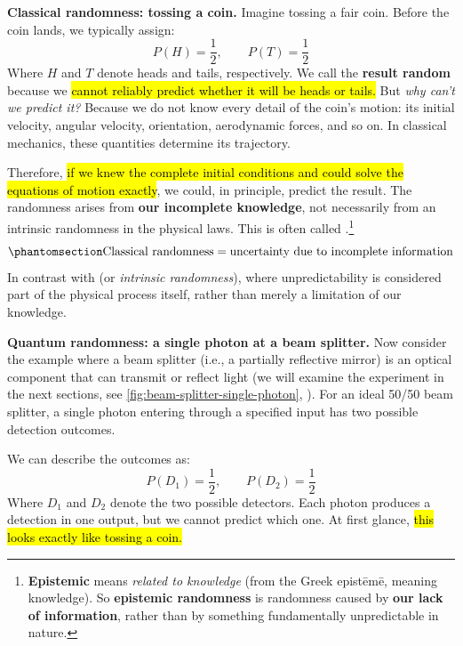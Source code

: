 \highspace
\textcolor{Green3}{ \textbf{Classical randomness: tossing a coin.}} Imagine tossing a fair coin. Before the coin lands, we typically assign:
\begin{equation*}
    P(H)=\frac{1}{2},\qquad P(T)=\frac{1}{2}
\end{equation*}
Where $H$ and $T$ denote heads and tails, respectively. We call the \textbf{result random} because we \hl{cannot reliably predict whether it will be heads or tails.} But \emph{why can't we predict it?} Because we do not know every detail of the coin's motion: its initial velocity, angular velocity, orientation, aerodynamic forces, and so on. In classical mechanics, these quantities determine its trajectory.

\highspace
Therefore, \hl{if we knew the complete initial conditions and could solve the equations of motion exactly}, we could, in principle, predict the result. The randomness arises from \textbf{our incomplete knowledge}, not necessarily from an intrinsic randomness in the physical laws. This is often called .\footnote{%
    \textbf{Epistemic} means \emph{related to knowledge} (from the Greek epistēmē, meaning knowledge). So \textbf{epistemic randomness} is randomness caused by \textbf{our lack of information}, rather than by something fundamentally unpredictable in nature.
}
\begin{equation*}\phantomsection\label{def:epistemic-randomness}
    \text{Classical randomness}
    =
    \text{uncertainty due to incomplete information}
\end{equation*}
In contrast with  (or \emph{intrinsic randomness}), where unpredictability is considered part of the physical process itself, rather than merely a limitation of our knowledge.

\highspace
\textcolor{Green3}{ \textbf{Quantum randomness: a single photon at a beam splitter.}} Now consider the example where a beam splitter (i.e., a partially reflective mirror) is an optical component that can transmit or reflect light (we will examine the experiment in the next sections, see \autoref{fig:beam-splitter-single-photon}, ). For an ideal 50/50 beam splitter, a single photon entering through a specified input has two possible detection outcomes.

\highspace
We can describe the outcomes as:
\begin{equation*}
    P(D_{1}) = \frac{1}{2},\qquad P(D_{2}) = \frac{1}{2}
\end{equation*}
Where $D_1$ and $D_2$ denote the two possible detectors. Each photon produces a detection in one output, but we cannot predict which one. At first glance, \hl{this looks exactly like tossing a coin.}


